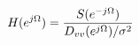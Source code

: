 \documentclass[preview]{standalone}
\begin{document}
\begin{align*}
\special{dvisvgm:raw <g id='unique000'>}H(e^{j\Omega})=\frac{S(e^{-j\Omega})}{D_{vv}(e^{j\Omega})/\sigma^2}\special{dvisvgm:raw </g>}
\end{align*}
\end{document}
